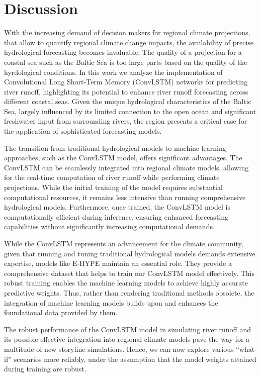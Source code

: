\documentclass[
]{agujournal2019}
\begin{document}
\section{Discussion}\label{discussion}

With the increasing demand of decision makers for regional climate
projections, that allow to quantify regional climate change impacts, the
availability of precise hydrological forecasting becomes invaluable. The
quality of a projection for a coastal sea such as the Baltic Sea is too
large parts based on the quality of the hyrdological conditions. In this
work we analyze the implementation of Convolutional Long Short-Term
Memory (ConvLSTM) networks for predicting river runoff, highlighting its
potential to enhance river runoff forecasting across different coastal
seas. Given the unique hydrological characteristics of the Baltic Sea,
largely influenced by its limited connection to the open ocean and
significant freshwater input from surrounding rivers, the region
presents a critical case for the application of sophisticated
forecasting models.

The transition from traditional hydrological models to machine learning
approaches, such as the ConvLSTM model, offers significant advantages.
The ConvLSTM can be seamlessly integrated into regional climate models,
allowing for the real-time computation of river runoff while performing
climate projections. While the initial training of the model requires
substantial computational resources, it remains less intensive than
running comprehensive hydrological models. Furthermore, once trained,
the ConvLSTM model is computationally efficient during inference,
ensuring enhanced forecasting capabilities without significantly
increasing computational demands.

While the ConvLSTM represents an advancement for the climate community,
given that running and tuning traditional hydrological models demands
extensive expertise, models like E-HYPE maintain an essential role. They
provide a comprehensive dataset that helps to train our ConvLSTM model
effectively. This robust training enables the machine learning models to
achieve highly accurate predictive weights. Thus, rather than rendering
traditional methods obsolete, the integration of machine learning models
builds upon and enhances the foundational data provided by them.

The robust performance of the ConvLSTM model in simulating river runoff
and its possible effective integration into regional climate models pave
the way for a multitude of new storyline simulations. Hence, we can now
explore various ``what-if'' scenarios more reliably, under the
assumption that the model weights attained during training are robust.
\end{document}
